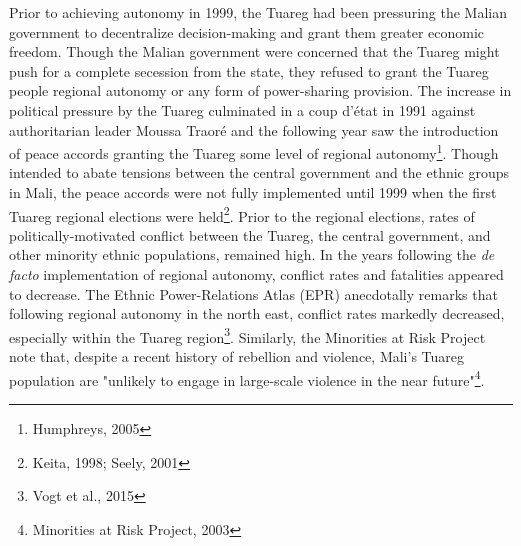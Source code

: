 \documentclass[12pt]{article}
\begin{document}
Prior to achieving autonomy in 1999, the Tuareg had been pressuring the Malian government to decentralize decision-making and grant them greater economic freedom. Though the Malian government were concerned that the Tuareg might push for a complete secession from the state, they refused to grant the Tuareg people regional autonomy or any form of power-sharing provision. The increase in political pressure by the Tuareg culminated in a coup d’état in 1991 against authoritarian leader Moussa Traoré and the following year saw the introduction of peace accords granting the Tuareg some level of regional autonomy\footnote{Humphreys, 2005}. Though intended to abate tensions between the central government and the ethnic groups in Mali, the peace accords were not fully implemented until 1999 when the first Tuareg regional elections were held\footnote{Keita, 1998; Seely, 2001}. Prior to the regional elections, rates of politically-motivated conflict between the Tuareg, the central government, and other minority ethnic populations, remained high. In the years following the \textit{de facto} implementation of regional autonomy, conflict rates and fatalities appeared to decrease. The Ethnic Power-Relations Atlas (EPR) anecdotally remarks that following regional autonomy in the north east, conflict rates markedly decreased, especially within the Tuareg region\footnote{Vogt et al., 2015}. Similarly, the Minorities at Risk Project note that, despite a recent history of rebellion and violence, Mali's Tuareg population are "unlikely to engage in large-scale violence in the near future"\footnote{Minorities at Risk Project, 2003}. 
\end{document}
